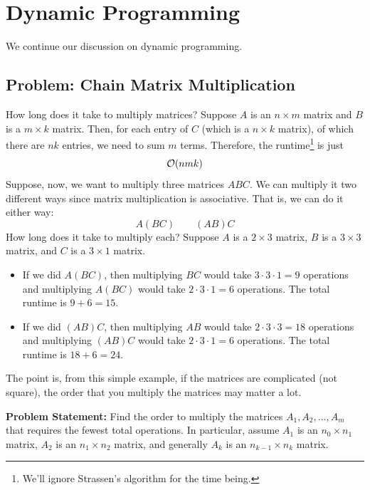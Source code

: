 \documentclass[letterpaper]{article}
\begin{document}
\section{Dynamic Programming}
We continue our discussion on dynamic programming. 

\subsection{Problem: Chain Matrix Multiplication}
How long does it take to multiply matrices? Suppose $A$ is an $n \times m$ matrix and $B$ is a $m \times k$ matrix. Then, for each entry of $C$ (which is a $n \times k$ matrix), of which there are $nk$ entries, we need to sum $m$ terms. Therefore, the runtime\footnote{We'll ignore Strassen's algorithm for the time being.} is just 
\[\mathcal{O}(nmk)\]
Suppose, now, we want to multiply three matrices $ABC$. We can multiply it two different ways since matrix multiplication is associative. That is, we can do it either way: 
\[A(BC) \qquad (AB)C\]
How long does it take to multiply each? Suppose $A$ is a $2 \times 3$ matrix, $B$ is a $3 \times 3$ matrix, and $C$ is a $3 \times 1$ matrix. 
\begin{itemize}
    \item If we did $A(BC)$, then multiplying $BC$ would take $3 \cdot 3 \cdot 1 = 9$ operations and multiplying $A(BC)$ would take $2 \cdot 3 \cdot 1 = 6$ operations. The total runtime is $9 + 6 = 15$. 
    \item If we did $(AB)C$, then multiplying $AB$ would take $2 \cdot 3 \cdot 3 = 18$ operations and multiplying $(AB)C$ would take $2 \cdot 3 \cdot 1 = 6$ operations. The total runtime is $18 + 6 = 24$. 
\end{itemize}
The point is, from this simple example, if the matrices are complicated (not square), the order that you multiply the matrices may matter a lot. 

\bigskip 

\textbf{Problem Statement:} Find the order to multiply the matrices $A_1, A_2, \dots, A_m$ that requires the fewest total operations. In particular, assume $A_1$ is an $n_0 \times n_1$ matrix, $A_2$ is an $n_1 \times n_2$ matrix, and generally $A_k$ is an $n_{k - 1} \times n_k$ matrix. 
\end{document}
